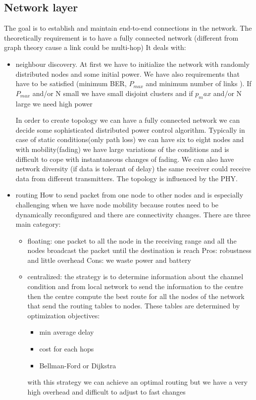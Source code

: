 \subsection{Network layer}
The goal is to establish and maintain end-to-end connections in the network. The theoretically requirement is to have a fully connected network (different from graph theory cause a link could be multi-hop)
It deals with:
\begin{itemize}
	\item neighbour discovery.
	At first we have to initialize the network with randomly distributed nodes and some initial power. We have also requirements that have to be satisfied (minimum BER, $ P_{max} $ and minimum number of links ). If $ P_{max} $ and/or N small we have small disjoint clusters and if $ p_max $ and/or N large we need high power
	
	In order to create topology we can have a fully connected network we can decide some sophisticated distributed power control algorithm. Typically in case of static conditions(only path loss) we can have six to eight nodes and with mobility(fading) we have large variations of the conditions and is difficult to cope with instantaneous changes of fading. We can also have network diversity (if data is tolerant of delay) the same receiver could receive data from different transmitters. The topology is influenced by the PHY. 
	
	\item routing 
	How to send packet from one node to other nodes and is especially challenging when we have node mobility because routes need to be dynamically reconfigured and there are connectivity changes. There are three main category:
	\begin{itemize}
		\item floating: one packet to all the node in the receiving range and all the nodes broadcast the packet until the destination is reach Pros: robustness and little overhead Cons: we waste power and battery
		\item centralized: the strategy is to determine information about the channel condition and from local network to send the information to the centre then the centre compute the best route for all the nodes of the network that send the routing tables to nodes. These tables are determined by optimization objectives: 
		\begin{itemize}
			\item min average delay
			\item cost for each hops
			\item Bellman-Ford or Dijkstra
		\end{itemize}
		with this strategy we can achieve an optimal routing but we have a very high overhead and difficult to adjust to fast changes
		

\end{itemize}
\end{itemize}
